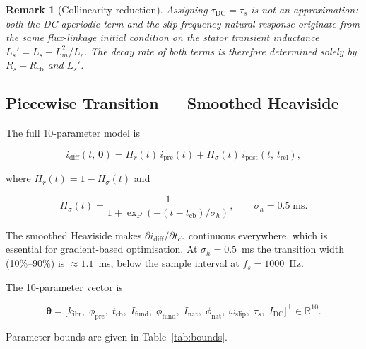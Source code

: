 \documentclass[11pt,a4paper]{article}
\newtheorem{remark}{Remark}
\newcommand{\vect}[1]{\boldsymbol{#1}}
\newcommand{\R}{\mathbb{R}}
\newcommand{\omegas}{\omega_{\text{slip}}}
\newcommand{\taus}{\tau_s}
\newcommand{\tcb}{t_{\text{cb}}}
\newcommand{\Hp}{H_\sigma}
\newcommand{\Hr}{H_r}
\begin{document}
\begin{remark}[Collinearity reduction]
  Assigning $\tau_{\text{DC}} = \taus$ is not an approximation: both the DC
  aperiodic term and the slip-frequency natural response originate from the
  same flux-linkage initial condition on the stator transient inductance
  $L_s' = L_s - L_m^2/L_r$.  The decay rate of both terms is therefore
  determined solely by $R_s + R_{\text{cb}}$ and $L_s'$.
\end{remark}

\subsection{Piecewise Transition — Smoothed Heaviside}
\label{sec:heaviside}

The full 10-parameter model is

\begin{equation}
  i_{\text{diff}}(t,\,\vect{\theta}) =
    \Hr(t)\,i_{\text{pre}}(t)
    + \Hp(t)\,i_{\text{post}}(t,\,t_{\text{rel}}),
  \label{eq:full}
\end{equation}

where $\Hr(t) = 1 - \Hp(t)$ and

\begin{equation}
  \Hp(t) = \frac{1}{1 + \exp\!\left(-(t - \tcb)/\sigma_h\right)},
  \qquad \sigma_h = 0.5\;\text{ms}.
  \label{eq:heaviside}
\end{equation}

The smoothed Heaviside makes $\partial i_{\text{diff}}/\partial\tcb$
continuous everywhere, which is essential for gradient-based optimisation.
At $\sigma_h = 0.5$~ms the transition width (10\%--90\%) is $\approx 1.1$~ms,
below the sample interval at $f_s = 1000$~Hz.

The 10-parameter vector is

\begin{equation}
  \vect{\theta} = \bigl[
    k_{\text{ibr}},\;\phi_{\text{pre}},\;\tcb,\;
    I_{\text{fund}},\;\phi_{\text{fund}},\;
    I_{\text{nat}},\;\phi_{\text{nat}},\;
    \omegas,\;\taus,\;I_{\text{DC}}
  \bigr]^\top \in \R^{10}.
  \label{eq:theta}
\end{equation}

Parameter bounds are given in Table~\ref{tab:bounds}.
\end{document}

